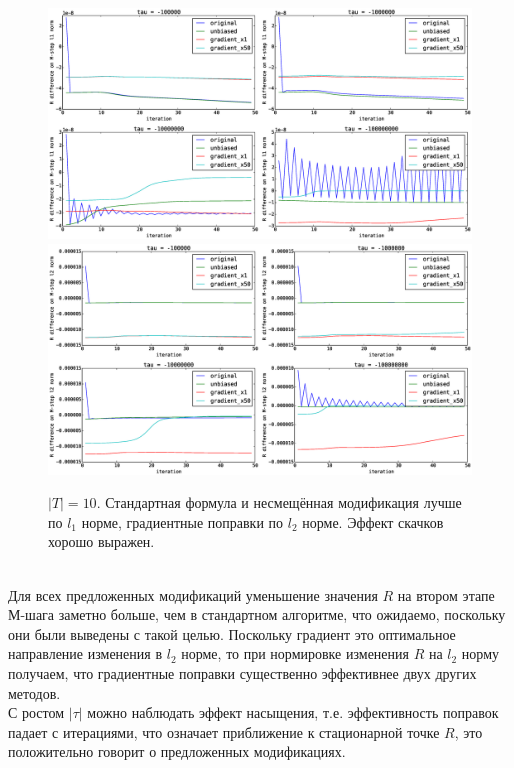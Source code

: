 \documentclass[12pt]{article}
\begin{document}
\begin{figure}[H]
	\centering
	\caption{$|T| = 10$. Стандартная формула и несмещённая модификация лучше по $l_1$ норме, градиентные поправки по $l_2$ норме. Эффект скачков хорошо выражен.}    
	\includegraphics[width=1.0\linewidth]{pictures/topics_10_RMstepDiffPerL1}
	\includegraphics[width=1.0\linewidth]{pictures/topics_10_RMstepDiffPerL2}
\end{figure}
\ \\
Для всех предложенных модификаций уменьшение значения $R$ на втором этапе М-шага заметно больше, чем в стандартном алгоритме, что ожидаемо, поскольку они были выведены с такой целью. Поскольку градиент это оптимальное направление изменения в $l_2$ норме, то при нормировке изменения $R$ на $l_2$ норму получаем, что градиентные поправки существенно эффективнее двух других методов.\\
С ростом $|\tau|$ можно наблюдать эффект насыщения, т.е. эффективность поправок падает с итерациями, что означает приближение к стационарной точке $R$, это положительно говорит о предложенных модификациях.
\end{document}

